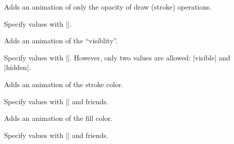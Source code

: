 \begin{command}{\pgfsys@animatestrokeopacity}
  Adds an animation of only the opacity of draw (stroke) operations.
  
  Specify values with |\pgfsys@animation@scalar|.
  
\begin{codeexample}[width=2cm]
\end{codeexample}
\end{command}

\begin{command}{\pgfsys@animatevisibility}
  Adds an animation of the ``visiblity''.
  
  Specify values with |\pgfsys@animation@text|. However, only two values are allowed:
  |visible| and |hidden|.
\begin{codeexample}[width=2cm]
\end{codeexample}
\end{command}

\begin{command}{\pgfsys@animatestrokecolor}
  Adds an animation of the stroke color.

  Specify values with |\pgfsys@animation@color@rgb| and friends.
\begin{codeexample}[width=2cm]
\end{codeexample}
\end{command}

\begin{command}{\pgfsys@animatefillcolor}
  Adds an animation of the fill color.
  
  Specify values with |\pgfsys@animation@color@rgb| and friends.
\begin{codeexample}[width=2cm]
\end{codeexample}
\end{command}


